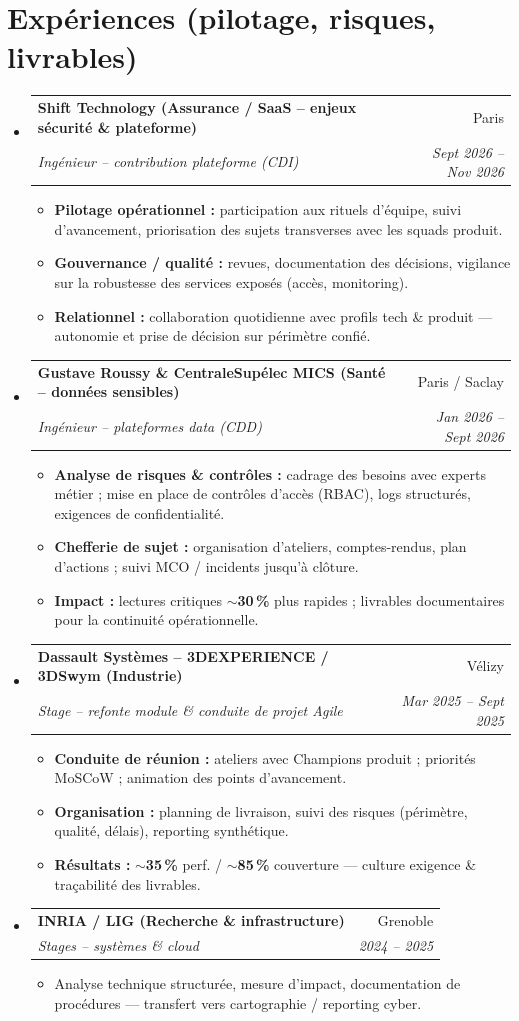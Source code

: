 \documentclass[letterpaper,10.5pt]{article}
\makeatletter
\newcommand{\resumeItem}[1]{\item\small{#1 \vspace{-2pt}}}
\newcommand{\resumeSubheading}[4]{\vspace{-2pt}\item\begin{tabular*}{0.97\textwidth}[t]{l@{\extracolsep{\fill}}r}\textbf{#1} & #2 \\\textit{\small#3} & \textit{\small #4} \\\end{tabular*}\vspace{-6pt}}
\newcommand{\resumeSubHeadingListStart}{\begin{itemize}[leftmargin=0.12in, label={}]}
\newcommand{\resumeSubHeadingListEnd}{\end{itemize}}
\newcommand{\resumeItemListStart}{\begin{itemize}[leftmargin=0.15in]}
\newcommand{\resumeItemListEnd}{\end{itemize}\vspace{-4pt}}
\makeatother
\begin{document}
\section{Exp\'eriences (pilotage, risques, livrables)}
\resumeSubHeadingListStart
  \resumeSubheading{Shift Technology (Assurance / SaaS -- enjeux s\'ecurit\'e \& plateforme)}{Paris}{Ing\'enieur -- contribution plateforme (CDI)}{Sept 2026 -- Nov 2026}
    \resumeItemListStart
      \resumeItem{\textbf{Pilotage op\'erationnel :} participation aux rituels d'\'equipe, suivi d'avancement, priorisation des sujets transverses avec les squads produit.}
      \resumeItem{\textbf{Gouvernance / qualit\'e :} revues, documentation des d\'ecisions, vigilance sur la robustesse des services expos\'es (acc\`es, monitoring).}
      \resumeItem{\textbf{Relationnel :} collaboration quotidienne avec profils tech \& produit --- autonomie et prise de d\'ecision sur p\'erim\`etre confi\'e.}
    \resumeItemListEnd
  \resumeSubheading{Gustave Roussy \& CentraleSup\'elec MICS (Sant\'e -- donn\'ees sensibles)}{Paris / Saclay}{Ing\'enieur -- plateformes data (CDD)}{Jan 2026 -- Sept 2026}
    \resumeItemListStart
      \resumeItem{\textbf{Analyse de risques \& contr\^oles :} cadrage des besoins avec experts m\'etier ; mise en place de contr\^oles d'acc\`es (RBAC), logs structur\'es, exigences de confidentialit\'e.}
      \resumeItem{\textbf{Chefferie de sujet :} organisation d'ateliers, comptes-rendus, plan d'actions ; suivi MCO / incidents jusqu'\`a cl\^oture.}
      \resumeItem{\textbf{Impact :} lectures critiques \textbf{$\sim$30\,\%} plus rapides ; livrables documentaires pour la continuit\'e op\'erationnelle.}
    \resumeItemListEnd
  \resumeSubheading{Dassault Syst\`emes -- 3DEXPERIENCE / 3DSwym (Industrie)}{V\'elizy}{Stage -- refonte module \& conduite de projet Agile}{Mar 2025 -- Sept 2025}
    \resumeItemListStart
      \resumeItem{\textbf{Conduite de r\'eunion :} ateliers avec Champions produit ; priorit\'es MoSCoW ; animation des points d'avancement.}
      \resumeItem{\textbf{Organisation :} planning de livraison, suivi des risques (p\'erim\`etre, qualit\'e, d\'elais), reporting synth\'etique.}
      \resumeItem{\textbf{R\'esultats :} \textbf{$\sim$35\,\%} perf. / \textbf{$\sim$85\,\%} couverture --- culture exigence \& tra\c{c}abilit\'e des livrables.}
    \resumeItemListEnd
  \resumeSubheading{INRIA / LIG (Recherche \& infrastructure)}{Grenoble}{Stages -- syst\`emes \& cloud}{2024 -- 2025}
    \resumeItemListStart
      \resumeItem{Analyse technique structur\'ee, mesure d'impact, documentation de proc\'edures --- transfert vers cartographie / reporting cyber.}
    \resumeItemListEnd
\resumeSubHeadingListEnd
\end{document}
